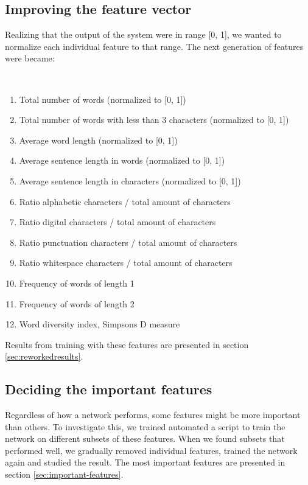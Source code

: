   \subsection{Improving the feature vector}
    Realizing that the output of the system were in range [0, 1], we wanted to
    normalize each individual feature to that range. The next generation of
    features were became:
  \begin{poem}\mbox{}\\[-\baselineskip]
    \begin{enumerate} \label{reworked-features}
      \item Total number of words (normalized to [0, 1])
      \item Total number of words with less than 3 characters 
        (normalized to [0, 1]) 
      \item Average word length 
        (normalized to [0, 1]) 
      \item Average sentence length in words
        (normalized to [0, 1]) 
      \item Average sentence length in characters
        (normalized to [0, 1]) 
      \item Ratio alphabetic characters / total amount of characters
      \item Ratio digital characters / total amount of characters
      \item Ratio punctuation characters / total amount of characters
      \item Ratio whitespace characters / total amount of characters
      \item Frequency of words of length 1
      \item Frequency of words of length 2
      \item Word diversity index, Simpsons D measure \cite{simpsons-measure}
    \end{enumerate} 
  \end{poem} 
  
  Results from training with these features are presented in section
  \ref{sec:reworkedresults}.

  \subsection{Deciding the important features}
    Regardless of how a network performs, some features might be more important
    than others. To investigate this, we trained automated a script to train
    the network on different subsets of these features. When we found subsets
    that performed well, we gradually removed individual features, trained the
    network again and studied the result. The most important features are
    presented in section \ref{sec:important-features}.
